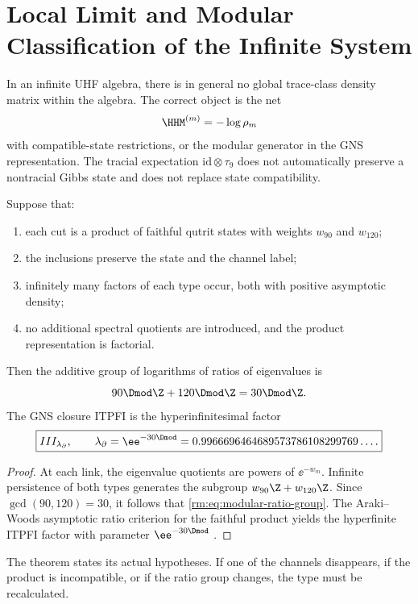 \section{Local Limit and Modular Classification of the Infinite System}

In an infinite UHF algebra, there is in general no global trace-class
density matrix within the algebra. The correct object is the
net
\begin{equation}
\label{rm:eq:modular-local-net}
\HHM^{(m)}=-\log\rho_m
\end{equation}
with compatible-state restrictions, or the modular generator in the
GNS representation. The tracial expectation \(\mathrm{id}\otimes\tau_9\) does
not automatically preserve a nontracial Gibbs state and does not
replace state compatibility.

\begin{theorem}
\label{rm:thm:modular-typeIII}
Suppose that:
\begin{enumerate}[label=(\roman*)]
\item each cut is a product of faithful qutrit states with weights
\(w_{90}\) and \(w_{120}\);
\item the inclusions preserve the state and the channel label;
\item infinitely many factors of each type occur, both with positive
asymptotic density;
\item no additional spectral quotients are introduced, and the
product representation is factorial.
\end{enumerate}
Then the additive group of logarithms of ratios of eigenvalues is
\begin{equation}
\label{rm:eq:modular-ratio-group}
90\Dmod\Z+120\Dmod\Z=30\Dmod\Z.
\end{equation}
The GNS closure ITPFI is the hyperinfinitesimal factor
\begin{equation}
\label{rm:eq:modular-typeIII-lambda}
\boxed{
III_{\lambda_\partial},
\qquad
\lambda_\partial=\ee^{-30\Dmod}
=0.9966696464689573786108299769\ldots .}
\end{equation}
\end{theorem}

\begin{proof}
At each link, the eigenvalue quotients are powers of \(\ee^{-w_m}\). Infinite persistence of both types generates the subgroup \(w_{90}\Z+w_{120}\Z\). Since \(\gcd(90,120)=30\), it follows that \cref{rm:eq:modular-ratio-group}. The Araki--Woods asymptotic ratio criterion for the faithful product yields the hyperfinite ITPFI factor with parameter \(\ee^{-30\Dmod}\) \cite{rm:ArakiWoods1968,rm:Takesaki}.
\end{proof}

The theorem states its actual hypotheses. If one of the channels disappears,
if the product is incompatible, or if the ratio group changes, the
type must be recalculated.

